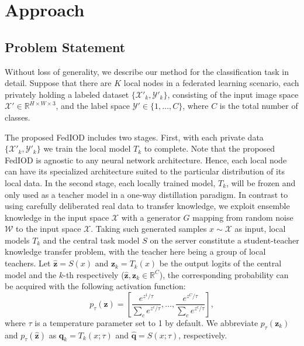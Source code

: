 \documentclass[letterpaper]{article} %
\makeatletter
\DeclareRobustCommand\onedot{\futurelet\@let@token\@onedot}
\def\@onedot{\ifx\@let@token.\else.\null\fi\xspace}
\def\ie{\emph{i.e}\onedot} \def\Ie{\emph{I.e}\onedot}
\newcommand{\domw}{\mathcal{W}}
\newcommand{\domx}{\mathcal{X}}
\newcommand{\domy}{\mathcal{Y}}
\makeatother
\begin{document}
\section{Approach}
\subsection{Problem Statement}
Without loss of generality, we describe our method for the classification task in detail.
Suppose that there are $K$ local nodes in a federated learning scenario, each privately holding a labeled dataset $ \{\domx'_k, \domy'_k \}$, consisting of the input image space $\domx' \in \mathbb{R}^{H \times W \times 3}$, and the label space $\domy' \in \{1, \dots, C \}$, where $C$ is the total number of classes.

The proposed FedIOD includes two stages. First, with each private data $\{\domx'_k, \domy'_k \}$ we train the local model $T_k$ to complete. Note that the proposed FedIOD is agnostic to any neural network architecture. Hence, each local node can have its specialized architecture suited to the particular distribution of its local data. In the second stage, each locally trained model, $T_k$, will be frozen and only used as a teacher model in a one-way distillation paradigm. In contrast to \cite{gong2022federated, li2021practical} using carefully deliberated real data to transfer knowledge, we exploit ensemble knowledge in the input space $\mathcal{X}$ with a generator $G$ mapping from random noise $\domw$ to the input space $\mathcal{X}$. Taking such generated samples $x \sim \mathcal{X}$ as input, local models $T_k$ and the central task model $S$ on the server constitute a student-teacher knowledge transfer problem, with the teacher here being a group of local teachers.
Let $\hat{\bm{z}}=S(x) $  and $\bm{z}_k=T_k(x)$ be the output logits of the central model and the $k$-th respectively ($\hat{\bm{z}}, \bm{z}_k \in \mathbb{R}^C$), the corresponding probability can be acquired with the following activation function:
\begin{equation}
\label{eq:softmax}
   p_\tau(\bm{z})= \left[\frac{e^{z^1/\tau}}{\sum_c{e^{ z^c/\tau}}}, \dots, \frac{e^{z^C/\tau}}{\sum_c{e^{ z^c/\tau}}}\right],
\end{equation}
where $\tau$ is a temperature parameter set to 1 by default. We abbreviate $p_\tau(\bm{z}_k)$ and $p_\tau(\hat{\bm{z}})$ as $\bm{q}_k = T_k (x; \tau) $ and $\hat{\bm{q}} = S(x; \tau)$, respectively.
\end{document}
